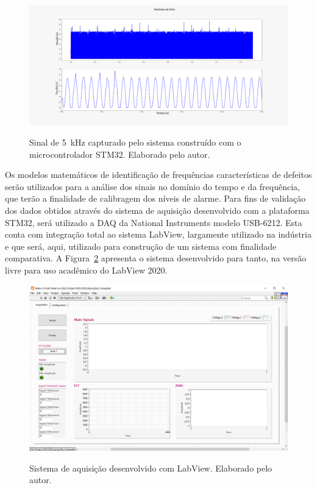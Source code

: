 \documentclass[
	12pt,				
	oneside,			
	a4paper,			
	english,			
	brazil,			
	]{abntex2ppgsi}
\begin{document}
\begin{figure}[H]
\centering
\caption {Sinal de \SI{5}{\kilo\hertz} capturado pelo sistema construído com o microcontrolador STM32. Elaborado pelo autor.}
\includegraphics[width=\textwidth,height=\textheight,keepaspectratio]{medidas_sistema_aquisicao_stm32}
\label{medidas_sistema_aquisicao_stm32}
\end{figure} 

Os modelos matemáticos de identificação de frequências características de defeitos serão utilizados para a análise dos sinais no domínio do tempo e da frequência, que terão a finalidade de calibragem dos níveis de alarme. Para fins de validação dos dados obtidos através do sistema de aquisição desenvolvido com a plataforma STM32, será utilizado a DAQ da National Instruments modelo USB-6212. Esta conta com integração total ao sistema LabView, largamente utilizado na indústria e que será, aqui, utilizado para construção de um sistema com finalidade comparativa. A Figura~\ref{sistema_labview} apresenta o sistema desenvolvido para tanto, na versão livre para uso acadêmico do LabView 2020.

\begin{figure}[H]
\centering
\caption {Sistema de aquisição desenvolvido com LabView. Elaborado pelo autor.}
\includegraphics[width=\textwidth,height=\textheight,keepaspectratio]{sistema_labview}
\label{sistema_labview}
\end{figure} 
\end{document}
